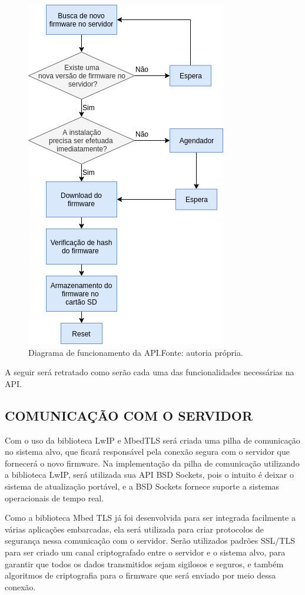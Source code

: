 \begin{figure}[H]
    \scriptsize
     \centering
     \includegraphics[scale=0.9]{dados/figuras/DiagAPI.png}
     \caption{Diagrama de funcionamento da API.\newline Fonte: autoria própria.}
     \label{fig:DiagAPI}
\end{figure}

A seguir será retratado como serão cada uma das funcionalidades necessárias na API.

\subsection{COMUNICAÇÃO COM O SERVIDOR}

Com o uso da biblioteca LwIP e MbedTLS será criada uma pilha de comunicação no sistema alvo, que ficará responsável pela conexão segura com o servidor que fornecerá o novo firmware. Na implementação da pilha de comunicação utilizando a  biblioteca LwIP, será utilizada sua API BSD Sockets, pois o intuito é deixar o sistema de atualização portável, e a BSD Sockets fornece suporte a sistemas operacionais de tempo real.

Como a biblioteca Mbed TLS já foi desenvolvida para ser integrada facilmente a várias aplicações embarcadas, ela será utilizada para criar protocolos de segurança nessa comunicação com o servidor. Serão utilizados padrões SSL/TLS para ser criado um canal criptografado entre o servidor e o sistema alvo, para garantir que todos os dados transmitidos sejam sigilosos e seguros, e também algoritmos de criptografia para o firmware que será enviado por meio dessa conexão.

